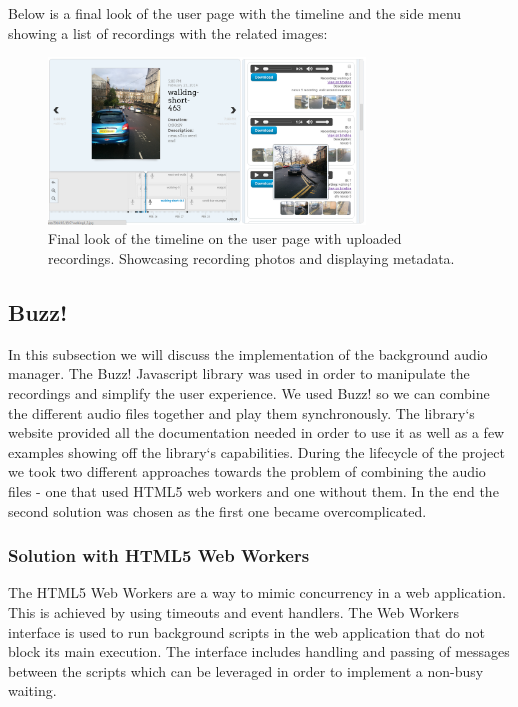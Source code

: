 \documentclass{l3proj}
\begin{document}
Below is a final look of the user page with the timeline and the side menu showing a list of recordings with the related images:

\begin{figure}[ht!]
  \centering
\includegraphics[width=0.75\textwidth]{images/timeline_final.png}
\caption{Final look of the timeline on the user page with uploaded recordings. Showcasing recording photos and displaying metadata.}
\end{figure}



\subsection{Buzz!}
In this subsection we will discuss the implementation of the background audio manager. The Buzz! Javascript library was used in order to manipulate the recordings and simplify the user experience. We used Buzz! so we can combine the different audio files together and play them synchronously. The library`s website provided all the documentation needed in order to use it as well as a few examples showing off the library`s capabilities. During the lifecycle of the project we took two different approaches towards the problem of combining the audio files - one that used HTML5 web workers and one without them. In the end the second solution was chosen as the first one became overcomplicated.

\subsubsection{Solution with HTML5 Web Workers}
The HTML5 Web Workers are a way to mimic concurrency in a web application. This is achieved by using timeouts and event handlers. The Web Workers interface is used to run background scripts in the web application that do not block its main execution. The interface includes handling and passing of messages between the scripts which can be leveraged in order to implement a non-busy waiting.
\end{document}
